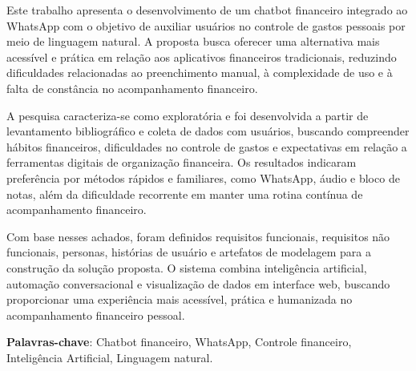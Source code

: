 \setlength{\absparsep}{18pt}
\begin{resumo}
Este trabalho apresenta o desenvolvimento de um chatbot financeiro integrado ao WhatsApp com o objetivo de auxiliar usuários no controle de gastos pessoais por meio de linguagem natural. A proposta busca oferecer uma alternativa mais acessível e prática em relação aos aplicativos financeiros tradicionais, reduzindo dificuldades relacionadas ao preenchimento manual, à complexidade de uso e à falta de constância no acompanhamento financeiro.

A pesquisa caracteriza-se como exploratória e foi desenvolvida a partir de levantamento bibliográfico e coleta de dados com usuários, buscando compreender hábitos financeiros, dificuldades no controle de gastos e expectativas em relação a ferramentas digitais de organização financeira. Os resultados indicaram preferência por métodos rápidos e familiares, como WhatsApp, áudio e bloco de notas, além da dificuldade recorrente em manter uma rotina contínua de acompanhamento financeiro.

Com base nesses achados, foram definidos requisitos funcionais, requisitos não funcionais, personas, histórias de usuário e artefatos de modelagem para a construção da solução proposta. O sistema combina inteligência artificial, automação conversacional e visualização de dados em interface web, buscando proporcionar uma experiência mais acessível, prática e humanizada no acompanhamento financeiro pessoal.

\textbf{Palavras-chave}: Chatbot financeiro, WhatsApp, Controle financeiro, Inteligência Artificial, Linguagem natural.
\end{resumo}

